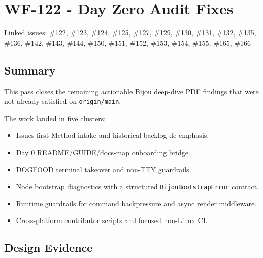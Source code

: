 \chapter{WF-122 - Day Zero Audit Fixes}\label{record-407}

\smallskip

Linked issues: \#122, \#123, \#124, \#125, \#127, \#129, \#130, \#131, \#132, \#135, \#136, \#142, \#143, \#144, \#150, \#151, \#152, \#153, \#154, \#155, \#165, \#166

\section{Summary}\label{record-407-summary}

This pass closes the remaining actionable Bijou deep-dive PDF findings that were not already satisfied on \texttt{o\allowbreak{}r\allowbreak{}i\allowbreak{}g\allowbreak{}i\allowbreak{}n\allowbreak{}/\allowbreak{}m\allowbreak{}a\allowbreak{}i\allowbreak{}n}.

The work landed in five clusters:

\begin{itemize}
\tightlist
\item
  Issues-first Method intake and historical backlog de-emphasis.
\item
  Day 0 README/GUIDE/docs-map onboarding bridge.
\item
  DOGFOOD terminal takeover and non-TTY guardrails.
\item
  Node bootstrap diagnostics with a structured \texttt{B\allowbreak{}i\allowbreak{}j\allowbreak{}o\allowbreak{}u\allowbreak{}B\allowbreak{}o\allowbreak{}o\allowbreak{}t\allowbreak{}s\allowbreak{}t\allowbreak{}r\allowbreak{}a\allowbreak{}p\allowbreak{}E\allowbreak{}r\allowbreak{}r\allowbreak{}o\allowbreak{}r} contract.
\item
  Runtime guardrails for command backpressure and async render middleware.
\item
  Cross-platform contributor scripts and focused non-Linux CI.
\end{itemize}

\section{Design Evidence}\label{record-407-design-evidence}

